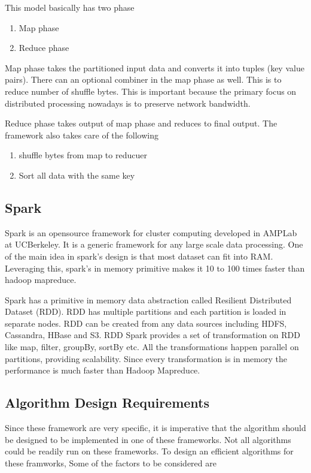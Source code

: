 \documentclass[conference]{IEEEtran}
\begin{document}
This model basically has two phase
\begin{enumerate}
\item Map phase
\item Reduce phase
\end{enumerate}

Map phase takes the partitioned input data and converts it into tuples (key value
pairs). There can an optional combiner in the map phase as well. This
is to reduce number of shuffle bytes. This is important because the
primary focus on distributed processing nowadays is to preserve
network bandwidth.

Reduce phase takes output of map phase and reduces to final
output. The framework also takes care of the following
\begin{enumerate}
\item shuffle bytes from map to reducuer
\item Sort all data with the same key
\end{enumerate}

\subsection{Spark}
Spark is an opensource framework for cluster computing developed in
AMPLab at UCBerkeley. It is a generic framework for any large scale
data processing. One of the main idea in spark's design is that most
dataset can fit into RAM. Leveraging this, spark's in memory primitive
makes it 10 to 100 times faster than hadoop mapreduce.

Spark has a primitive in memory data abstraction called Resilient Distributed
Dataset (RDD). RDD has multiple partitions and each partition is
loaded in separate nodes. RDD can be created from any data sources including
HDFS, Cassandra, HBase and S3. RDD Spark provides a set of transformation on
RDD like map, filter, groupBy, sortBy etc. All the transformations
happen parallel on partitions, providing scalability. Since every transformation
is in memory the performance is much faster than Hadoop Mapreduce.

\subsection{Algorithm Design Requirements}

Since these framework are very specific, it is imperative that the
algorithm should be designed to be implemented in one of these
frameworks. Not all algorithms could be readily run on these
frameworks. To design an efficient algorithms for these framworks,
Some of the factors to be considered are
\end{document}
